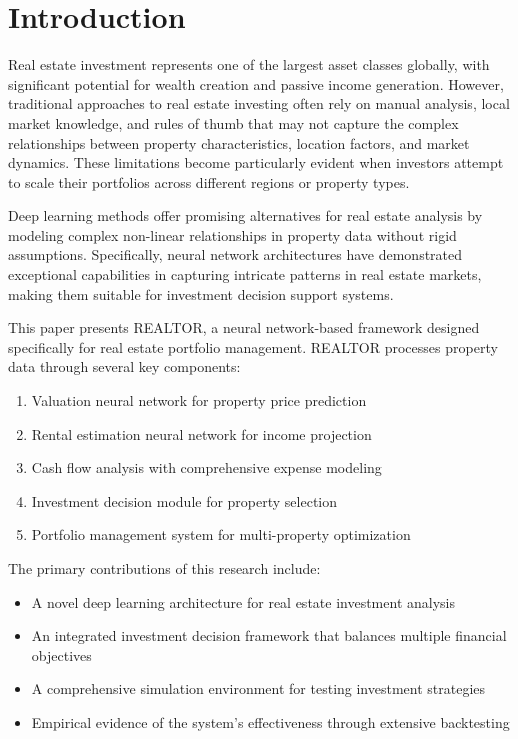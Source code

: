 \documentclass[conference]{IEEEtran}
\begin{document}
\section{Introduction}
Real estate investment represents one of the largest asset classes globally, with significant potential for wealth creation and passive income generation. However, traditional approaches to real estate investing often rely on manual analysis, local market knowledge, and rules of thumb that may not capture the complex relationships between property characteristics, location factors, and market dynamics. These limitations become particularly evident when investors attempt to scale their portfolios across different regions or property types.

Deep learning methods offer promising alternatives for real estate analysis by modeling complex non-linear relationships in property data without rigid assumptions. Specifically, neural network architectures have demonstrated exceptional capabilities in capturing intricate patterns in real estate markets, making them suitable for investment decision support systems.

This paper presents REALTOR, a neural network-based framework designed specifically for real estate portfolio management. REALTOR processes property data through several key components:

\begin{enumerate}
\item Valuation neural network for property price prediction
\item Rental estimation neural network for income projection
\item Cash flow analysis with comprehensive expense modeling
\item Investment decision module for property selection
\item Portfolio management system for multi-property optimization
\end{enumerate}

The primary contributions of this research include:

\begin{itemize}
\item A novel deep learning architecture for real estate investment analysis
\item An integrated investment decision framework that balances multiple financial objectives
\item A comprehensive simulation environment for testing investment strategies
\item Empirical evidence of the system's effectiveness through extensive backtesting
\end{itemize}
\end{document}
